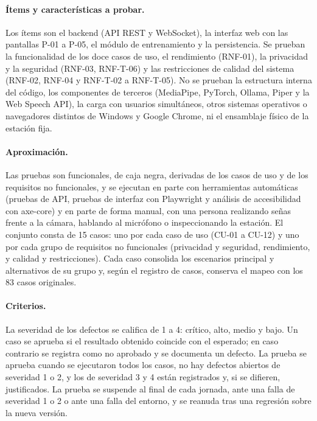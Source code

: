 \paragraph{Ítems y características a probar.} Los ítems son el backend (API REST y WebSocket), la interfaz web con las pantallas P-01 a P-05, el módulo de entrenamiento y la persistencia. Se prueban la funcionalidad de los doce casos de uso, el rendimiento (RNF-01), la privacidad y la seguridad (RNF-03, RNF-T-06) y las restricciones de calidad del sistema (RNF-02, RNF-04 y RNF-T-02 a RNF-T-05). No se prueban la estructura interna del código, los componentes de terceros (MediaPipe, PyTorch, Ollama, Piper y la Web Speech API), la carga con usuarios simultáneos, otros sistemas operativos o navegadores distintos de Windows y Google Chrome, ni el ensamblaje físico de la estación fija.

\paragraph{Aproximación.} Las pruebas son funcionales, de caja negra, derivadas de los casos de uso y de los requisitos no funcionales, y se ejecutan en parte con herramientas automáticas (pruebas de API, pruebas de interfaz con Playwright y análisis de accesibilidad con axe-core) y en parte de forma manual, con una persona realizando señas frente a la cámara, hablando al micrófono o inspeccionando la estación. El conjunto consta de 15 casos: uno por cada caso de uso (CU-01 a CU-12) y uno por cada grupo de requisitos no funcionales (privacidad y seguridad, rendimiento, y calidad y restricciones). Cada caso consolida los escenarios principal y alternativos de su grupo y, según el registro de casos, conserva el mapeo con los 83 casos originales.

\paragraph{Criterios.} La severidad de los defectos se califica de 1 a 4: crítico, alto, medio y bajo. Un caso se aprueba si el resultado obtenido coincide con el esperado; en caso contrario se registra como no aprobado y se documenta un defecto. La prueba se aprueba cuando se ejecutaron todos los casos, no hay defectos abiertos de severidad 1 o 2, y los de severidad 3 y 4 están registrados y, si se difieren, justificados. La prueba se suspende al final de cada jornada, ante una falla de severidad 1 o 2 o ante una falla del entorno, y se reanuda tras una regresión sobre la nueva versión.

